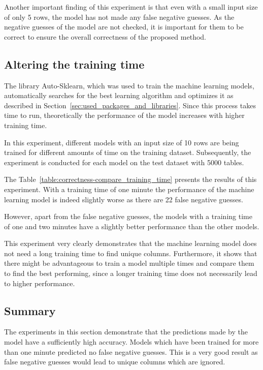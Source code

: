 Another important finding of this experiment is that even with a small input size of only \num{5} rows, the model has not made any false negative guesses. As the negative guesses of the model are not checked, it is important for them to be correct to ensure the overall correctness of the proposed method.




\subsection{Altering the training time}\label{subsec:correctness_comparing-training-time}
The library Auto-Sklearn, which was used to train the machine learning models, automatically searches for the best learning algorithm and optimizes it as described in Section~\ref{sec:used_packages_and_libraries}. Since this process takes time to run, theoretically the performance of the model increases with higher training time.

In this experiment, different models with an input size of \num{10} rows are being trained for different amounts of time on the training dataset. Subsequently, the experiment is conducted for each model on the test dataset with \num{5000} tables.

The Table~\ref{table:correctness-compare_training_time} presents the results of this experiment. With a training time of one minute the performance of the machine learning model is indeed slightly worse as there are \num{22} false negative guesses.

However, apart from the false negative guesses, the models with a training time of one and two minutes have a slightly better performance than the other models.

This experiment very clearly demonstrates that the machine learning model does not need a long training time to find unique columns. Furthermore, it shows that there might be advantageous to train a model multiple times and compare them to find the best performing, since a longer training time does not necessarily lead to higher performance.




\subsection{Summary}\label{subsec:correctness_conclusions}
The experiments in this section demonstrate that the predictions made by the model have a sufficiently high accuracy. Models which have been trained for more than one minute predicted no false negative guesses. This is a very good result as false negative guesses would lead to unique columns which are ignored.


